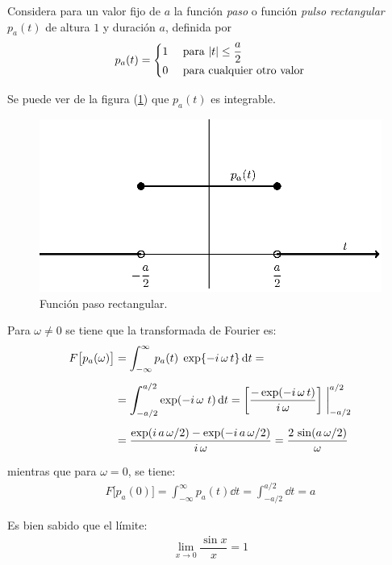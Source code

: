 Considera para un valor fijo de $a$ la función \emph{paso} o función \emph{pulso rectangular} $p_{a}(t)$ de altura $1$ y duración $a$, definida por
\begin{align}
p_{a}(t) = \begin{cases}
1 & \text{ para } \abs{t} \leq \dfrac{a}{2} \\
0 & \text{ para cualquier otro valor} \end{cases}
\label{eq:ecuacion_06_10_Beerends}
\end{align}

Se puede ver de la figura (\ref{fig:figura_funcionpaso}) que $p_{a}(t)$ es integrable.
\begin{figure}[H]
    \centering
    \includegraphics[scale=1]{Imagenes/funcion_paso.eps}
    \caption{Función paso rectangular.}
    \label{fig:figura_funcionpaso}
\end{figure}

Para $\omega \neq 0$ se tiene que la transformada de Fourier es:
\begin{align*}
F \big[p_{a} (\omega)\big] &= \int_{-\infty}^{\infty} p_{a}(t) \; \exp{-i \, \omega \, t} \dd{t} = \\[0.5em]
&= \scaleint{6ex}_{\bs -a/2}^{a/2} \exp(-i \, \omega \ t) \dd{t} = \left[ \dfrac{- \exp(- i \, \omega \, t)}{i \, \omega} \right] \eval_{-a/2}^{a/2} \\[0.5em]
&= \dfrac{\exp(i \, a \, \omega/2) - \exp(-i \, a \, \omega/2)}{i \, \omega} = \dfrac{2 \, \sin (a \, \omega/2)}{\omega}
\end{align*}

mientras que para $\omega = 0$, se tiene:
\begin{align*}
F \big[p_{a}(0)\big] = \int_{-\infty}^{\infty} p_{a}(t) \dd{t} = \int_{-a/2}^{a/2} \dd{t} = a
\end{align*}

Es bien sabido que el límite:
\begin{align*}
\lim_{x \to 0} \dfrac{\sin x}{x} = 1
\end{align*}

